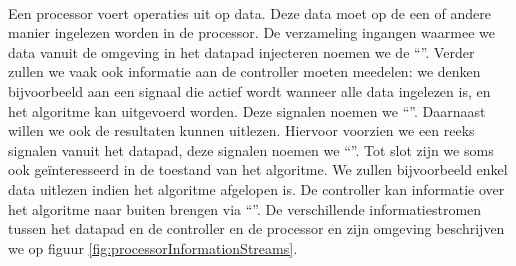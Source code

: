 \paragraph{}
Een processor voert operaties uit op data. Deze data moet op de een of andere manier ingelezen worden in de processor. De verzameling ingangen waarmee we data vanuit de omgeving in het datapad injecteren noemen we de ``''. Verder zullen we vaak ook informatie aan de controller moeten meedelen: we denken bijvoorbeeld aan een signaal die actief wordt wanneer alle data ingelezen is, en het algoritme kan uitgevoerd worden. Deze signalen noemen we ``''. Daarnaast willen we ook de resultaten kunnen uitlezen. Hiervoor voorzien we een reeks signalen vanuit het datapad, deze signalen noemen we ``''. Tot slot zijn we soms ook ge\"interesseerd in de toestand van het algoritme. We zullen bijvoorbeeld enkel data uitlezen indien het algoritme afgelopen is. De controller kan informatie over het algoritme naar buiten brengen via ``''. De verschillende informatiestromen tussen het datapad en de controller en de processor en zijn
omgeving beschrijven we op figuur \ref{fig:processorInformationStreams}.
